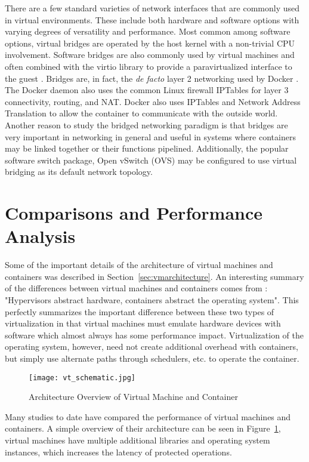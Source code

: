 There are a few standard varieties of network interfaces that are commonly used in virtual environments.
These include both hardware and software options with varying degrees of versatility and performance.  
Most common among software options, virtual bridges are operated by the host kernel with a non-trivial CPU involvement. 
Software bridges are also commonly used by virtual machines and often combined with the virtio library to provide a paravirtualized interface to the guest \autocite{_virtio_1}. 
Bridges are, in fact, the \emph{de facto} layer 2 networking used by Docker \autocite{dockernetworking1}.  
The Docker daemon also uses the common Linux firewall IPTables for layer 3 connectivity, routing, and NAT.
Docker also uses IPTables and Network Address Translation to allow the container to communicate with the outside world.
Another reason to study the bridged networking paradigm is that bridges are very important in networking in general and useful in systems where containers may be linked together or their functions pipelined.
Additionally, the popular software switch package, Open vSwitch (OVS) may be configured to use virtual bridging as its default network topology.


\section{Comparisons and Performance Analysis} %
\label{sec:comparisons_performance_analysis}
Some of the important details of the architecture of virtual machines and containers was described in Section~\ref{sec:vmarchitecture}.
An interesting summary of the differences between virtual machines and containers comes from \autocite{morabitohypervisors}: "Hypervisors abstract hardware, containers abstract the operating system". 
This perfectly summarizes the important difference between these two types of virtualization in that virtual machines must emulate hardware devices with software which almost always has some performance impact.  
Virtualization of the operating system, however, need not create additional overhead with containers, but simply use alternate paths through schedulers, etc. to operate the container. 

\begin{figure}
    \centering
    \texttt{[image: vt\_schematic.jpg]}
    \caption{Architecture Overview of Virtual Machine and Container}
    \label{fig:vtschematic}
\end{figure}
Many studies to date have compared the performance of virtual machines and containers.
A simple overview of their architecture can be seen in Figure~\ref{fig:vtschematic}, virtual machines have multiple additional libraries and operating system instances, which increases the latency of protected operations.  

